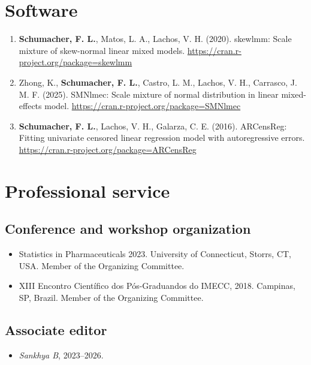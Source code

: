 \documentclass[
  10pt,
  letterpaper,
]{article}
\providecommand{\tightlist}{%
  \setlength{\itemsep}{0pt}\setlength{\parskip}{0pt}}
\begin{document}
\section{Software}\label{software}

\begin{enumerate}
\def\labelenumi{\arabic{enumi}.}
\tightlist
\item
  \textbf{Schumacher, F. L.}, Matos, L. A., Lachos, V. H. (2020).
  skewlmm: Scale mixture of skew-normal linear mixed models.
  \url{https://cran.r-project.org/package=skewlmm}
\item
  Zhong, K., \textbf{Schumacher, F. L.}, Castro, L. M., Lachos, V. H.,
  Carrasco, J. M. F. (2025). SMNlmec: Scale mixture of normal
  distribution in linear mixed-effects model.
  \url{https://cran.r-project.org/package=SMNlmec}
\item
  \textbf{Schumacher, F. L.}, Lachos, V. H., Galarza, C. E. (2016).
  ARCensReg: Fitting univariate censored linear regression model with
  autoregressive errors.
  \url{https://cran.r-project.org/package=ARCensReg}
\end{enumerate}

\section{Professional service}\label{professional-service}

\subsection{Conference and workshop
organization}\label{conference-and-workshop-organization}

\begin{itemize}
\tightlist
\item
  Statistics in Pharmaceuticals 2023. University of Connecticut, Storrs,
  CT, USA. Member of the Organizing Committee.
\item
  XIII Encontro Científico dos Pós-Graduandos do IMECC, 2018. Campinas,
  SP, Brazil. Member of the Organizing Committee.
\end{itemize}

\subsection{Associate editor}\label{associate-editor}

\begin{itemize}
\tightlist
\item
  \emph{Sankhya B}, 2023--2026.
\end{itemize}
\end{document}
